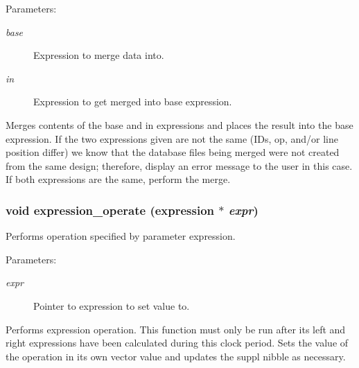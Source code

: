 \begin{Desc}
\item[Parameters: ]\par
\begin{description}
\item[{\em 
base}]Expression to merge data into. \item[{\em 
in}]Expression to get merged into base expression.\end{description}
\end{Desc}
Merges contents of the base and in expressions and places the result into the base expression. If the two expressions given are not the same (IDs, op, and/or line position differ) we know that the database files being merged  were not created from the same design; therefore, display an error message  to the user in this case. If both expressions are the same, perform the  merge. 
\subsubsection{\setlength{\rightskip}{0pt plus 5cm}void expression\_\-operate ({\bf expression} $\ast$ {\em expr})}\label{expr_8h_a6}


Performs operation specified by parameter expression.

\begin{Desc}
\item[Parameters: ]\par
\begin{description}
\item[{\em 
expr}]Pointer to expression to set value to.\end{description}
\end{Desc}
Performs expression operation. This function must only be run after its left and right expressions have been calculated during this clock period. Sets the value of the operation in its own vector value and updates the suppl nibble as necessary. 